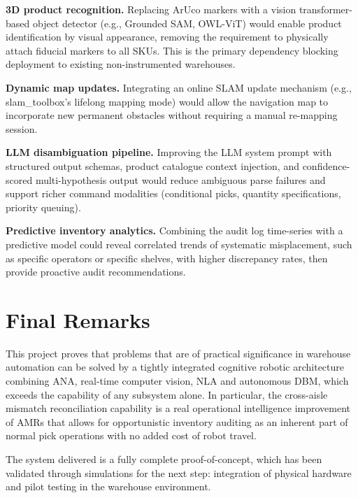 \documentclass[12pt,a4paper]{report}
\begin{document}
\textbf{3D product recognition.} Replacing ArUco markers with a vision transformer-based object detector (e.g., Grounded SAM, OWL-ViT) would enable product identification by visual appearance, removing the requirement to physically attach fiducial markers to all SKUs. This is the primary dependency blocking deployment to existing non-instrumented warehouses.

\textbf{Dynamic map updates.} Integrating an online SLAM update mechanism (e.g., slam\_toolbox's lifelong mapping mode) would allow the navigation map to incorporate new permanent obstacles without requiring a manual re-mapping session.

\textbf{LLM disambiguation pipeline.} Improving the LLM system prompt with structured output schemas, product catalogue context injection, and confidence-scored multi-hypothesis output would reduce ambiguous parse failures and support richer command modalities (conditional picks, quantity specifications, priority queuing).

\textbf{Predictive inventory analytics.} Combining the audit log time-series with a predictive model could reveal correlated trends of systematic misplacement, such as specific operators or specific shelves, with higher discrepancy rates, then provide proactive audit recommendations.

\section{Final Remarks}

This project proves that problems that are of practical significance in warehouse automation can be solved by a tightly integrated cognitive robotic architecture combining ANA, real-time computer vision, NLA and autonomous DBM, which exceeds the capability of any subsystem alone. In particular, the cross-aisle mismatch reconciliation capability is a real operational intelligence improvement of AMRs that allows for opportunistic inventory auditing as an inherent part of normal pick operations with no added cost of robot travel.

The system delivered is a fully complete proof-of-concept, which has been validated through simulations for the next step: integration of physical hardware and pilot testing in the warehouse environment.
\end{document}
